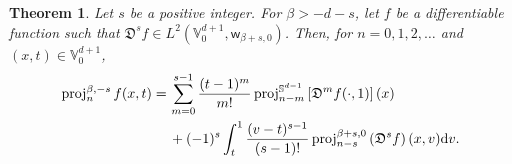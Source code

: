\documentclass[10pt,a4paper]{amsart}
\newtheorem{thm}{Theorem}
\def\VV{{\mathbb V}}
\def\b{{\beta}}
\def\d{\mathrm{d}}
\def\fD{{\mathfrak D}}
\def\o{{\omega}}
\def\proj{\operatorname{proj}}
\def\s{\sigma}
\def\sph{{\mathbb{S}^{d-1}}}
\def\sw{{\mathsf w}}
\begin{document}
\begin{thm} \label{thm:proj-s=int}
Let $s$ be a positive integer. For $\b > -d-s$, let $f$ be a differentiable function such that
$\fD^s f \in L^2(\VV_0^{d+1}, \sw_{\b+s,0})$. Then, for $n =0,1,2,\ldots$ and $(x,t) \in \VV_0^{d+1}$,
\begin{align}\label{eq:proj-s=int}
   \proj_n^{\b,-s} f(x,t) = \,& \sum_{m=0}^{s-1} \frac{(t-1)^m}{m!} \proj_{n-m}^\sph  \left[\fD^m f(\cdot,1)\right](x) \\
        & + (-1)^s \int_{t}^{1} \frac{(v-t)^{s-1}}{(s-1)!} \proj_{n-s}^{\b+s,0} \left(\fD^s f\right) (x, v) \d v. \notag
\end{align}
\end{thm}
\end{document}
